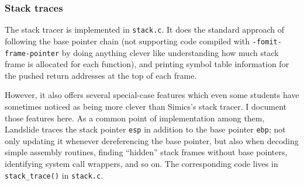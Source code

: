 \subsubsection{Stack traces}
\label{sec:landslide-stacktrace}

The stack tracer is implemented in {\tt stack.c}.
It does the standard approach of following the base pointer chain
(not supporting code compiled with {\tt -fomit-frame-pointer} by doing anything clever
like understanding how much stack frame is allocated for each function),
and printing symbol table information for the pushed return addresses at the top of each frame.

However, it also offers several special-case features
which even some students have sometimes noticed as being more clever than Simics's stack tracer.
I document those features here.
As a common point of implementation among them,
Landslide traces the stack pointer {\tt esp} in addition to the base pointer {\tt ebp};
not only updating it whenever dereferencing the base pointer,
but also when decoding simple assembly routines, finding ``hidden'' stack frames without base pointers,
identifying system call wrappers, and so on.
The corresponding code lives in {\tt stack\_trace()} in {\tt stack.c}.

